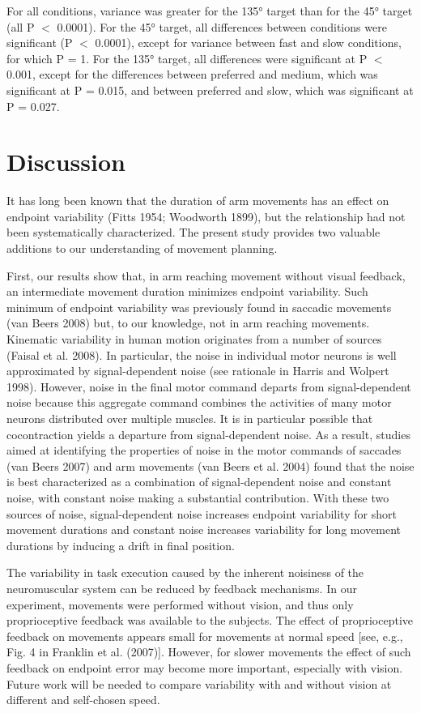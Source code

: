 For all conditions, variance was greater for the \ang{135} target
than for the \ang{45} target (all P $<$ 0.0001). For the \ang{45} target, all differences between conditions were significant (P $<$ 0.0001), except for variance between fast and slow conditions, for which P = 1. For the \ang{135} target, all differences were significant at P $<$ 0.001, except for the differences between preferred and medium, which was significant at P = 0.015, and between preferred and slow, which was significant at P = 0.027.

\section{Discussion}

It has long been known that the duration of arm movements
has an effect on endpoint variability (Fitts 1954; Woodworth 1899), but the relationship had not been systematically characterized. The present study provides two valuable additions to our understanding of movement planning.

First, our results show that, in arm reaching movement
without visual feedback, an intermediate movement duration minimizes endpoint variability. Such minimum of endpoint variability was previously found in saccadic movements (van Beers 2008) but, to our knowledge, not in arm reaching movements. Kinematic variability in human motion originates from a number of sources (Faisal et al. 2008). In particular, the noise in individual motor neurons is well approximated by signal-dependent noise (see rationale in Harris and Wolpert 1998). However, noise in the final motor command departs from signal-dependent noise because this aggregate command combines the activities of many motor neurons distributed over multiple muscles. It is in particular possible that cocontraction yields a departure from signal-dependent noise. As a result, studies aimed at identifying the properties of noise in the motor commands of saccades (van Beers 2007) and arm movements (van Beers et al. 2004) found that the noise is best characterized as a combination of signal-dependent noise and constant noise, with constant noise making a substantial contribution. With these two sources of noise, signal-dependent noise increases endpoint variability for short movement durations and constant noise increases variability for long movement durations by inducing a drift in final position.

The variability in task execution caused by the inherent noisiness of the neuromuscular system can be reduced by feedback mechanisms. In our experiment, movements were performed without vision, and thus only proprioceptive feedback was available to the subjects. The effect of proprioceptive feedback on movements appears small for movements at normal speed [see, e.g., Fig. 4 in Franklin et al. (2007)]. However, for slower movements the effect of such feedback on endpoint error may become more important, especially with vision. Future work will be needed to compare variability with and without vision at different and self-chosen speed.

